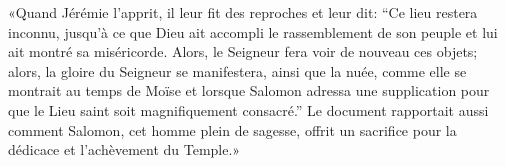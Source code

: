 «Quand Jérémie l’apprit, il leur fit des reproches et leur dit:
	“Ce lieu restera inconnu,
	jusqu’à ce que Dieu ait accompli le rassemblement de son peuple
	et lui ait montré sa miséricorde.
Alors, le Seigneur fera voir de nouveau ces objets;
	alors, la gloire du Seigneur se manifestera, ainsi que la nuée,
			comme elle se montrait au temps de Moïse
		et lorsque Salomon adressa une supplication
			pour que le Lieu saint soit magnifiquement consacré.”
Le document rapportait aussi comment Salomon, cet homme plein de sagesse,
	offrit un sacrifice pour la dédicace et l’achèvement du Temple.»
